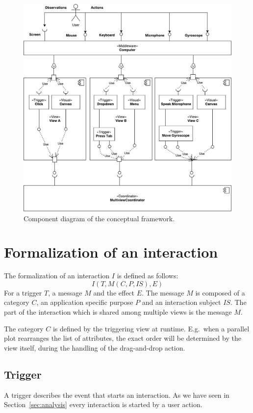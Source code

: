 \begin{figure}[ht]
  \centering
  \caption{%
    Component diagram of the conceptual framework.
  }\label{fig:concept:component-diagram}
  \includegraphics[width=\textwidth]{figures/concept/Concept}
\end{figure}


\section{Formalization of an interaction}

The formalization of an interaction $I$ is defined as follows:
\begin{equation}
  I(T, M(C,P,IS), E)
\end{equation}
For a trigger $T$, a message $M$ and the effect $E$.
The message $M$ is composed of a category $C$, an application specific purpose $P$ and an interaction subject $IS$.
The part of the interaction which is shared among multiple views is the message $M$.

The category $C$ is defined by the triggering view at runtime.
E.g.\ when a parallel plot rearranges the list of attributes, the exact order will be determined by the view itself, during the handling of the drag-and-drop action.


\subsection{Trigger}
A trigger describes the event that starts an interaction.
As we have seen in Section~\ref{sec:analysis} every interaction is started by a user action.

